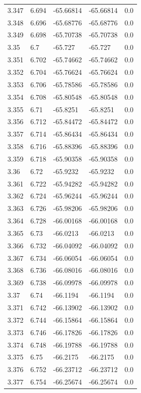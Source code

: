 \begin{tabular}{lllll}
3.347 & 6.694 & -65.66814 & -65.66814 & 0.0 \\
3.348 & 6.696 & -65.68776 & -65.68776 & 0.0 \\
3.349 & 6.698 & -65.70738 & -65.70738 & 0.0 \\
3.35 & 6.7 & -65.727 & -65.727 & 0.0 \\
3.351 & 6.702 & -65.74662 & -65.74662 & 0.0 \\
3.352 & 6.704 & -65.76624 & -65.76624 & 0.0 \\
3.353 & 6.706 & -65.78586 & -65.78586 & 0.0 \\
3.354 & 6.708 & -65.80548 & -65.80548 & 0.0 \\
3.355 & 6.71 & -65.8251 & -65.8251 & 0.0 \\
3.356 & 6.712 & -65.84472 & -65.84472 & 0.0 \\
3.357 & 6.714 & -65.86434 & -65.86434 & 0.0 \\
3.358 & 6.716 & -65.88396 & -65.88396 & 0.0 \\
3.359 & 6.718 & -65.90358 & -65.90358 & 0.0 \\
3.36 & 6.72 & -65.9232 & -65.9232 & 0.0 \\
3.361 & 6.722 & -65.94282 & -65.94282 & 0.0 \\
3.362 & 6.724 & -65.96244 & -65.96244 & 0.0 \\
3.363 & 6.726 & -65.98206 & -65.98206 & 0.0 \\
3.364 & 6.728 & -66.00168 & -66.00168 & 0.0 \\
3.365 & 6.73 & -66.0213 & -66.0213 & 0.0 \\
3.366 & 6.732 & -66.04092 & -66.04092 & 0.0 \\
3.367 & 6.734 & -66.06054 & -66.06054 & 0.0 \\
3.368 & 6.736 & -66.08016 & -66.08016 & 0.0 \\
3.369 & 6.738 & -66.09978 & -66.09978 & 0.0 \\
3.37 & 6.74 & -66.1194 & -66.1194 & 0.0 \\
3.371 & 6.742 & -66.13902 & -66.13902 & 0.0 \\
3.372 & 6.744 & -66.15864 & -66.15864 & 0.0 \\
3.373 & 6.746 & -66.17826 & -66.17826 & 0.0 \\
3.374 & 6.748 & -66.19788 & -66.19788 & 0.0 \\
3.375 & 6.75 & -66.2175 & -66.2175 & 0.0 \\
3.376 & 6.752 & -66.23712 & -66.23712 & 0.0 \\
3.377 & 6.754 & -66.25674 & -66.25674 & 0.0 \\

\end{tabular}
